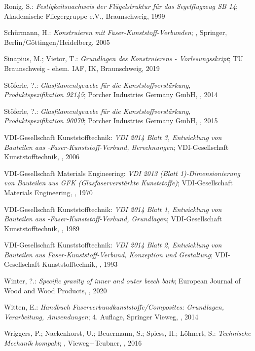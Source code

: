 \begin{thebibliography}{99}
	Ronig, S.:
	\textit{\glqq Festigkeitsnachweis der Flügelstruktur für das Segelflugzeug SB 14\grqq};
	Akademische Fliegergruppe e.V., Braunschweig, 1999 
	
	Schürmann, H.:
	\textit{\glqq Konstruieren mit Faser-Kunststoff-Verbunden\grqq};
	, Springer, Berlin/Göttingen/Heidelberg, 2005 
	
	Sinapius, M.; Vietor, T.:
	\textit{\glqq Grundlagen des Konstruierens - Vorlesungsskript\grqq};
	TU Braunschweig - ehem. IAF, IK, Braunschweig, 2019
	
	Stöferle, ?.:
	\textit{\glqq Glasfilamentgewebe für die Kunststoffverstärkung, Produktspezifikation 92145\grqq};
	Porcher Industries Germany GmbH, , 2014
	
	Stöferle, ?.:
	\textit{\glqq Glasfilamentgewebe für die Kunststoffverstärkung, Produktspezifikation 90070\grqq};
	Porcher Industries Germany GmbH, , 2015
	
	VDI-Gesellschaft Kunststofftechnik:
	\textit{\glqq VDI 2014 Blatt 3, Entwicklung von Bauteilen aus -Faser-Kunststoff-Verbund, Berechnungen\grqq};
	VDI-Gesellschaft Kunststofftechnik, , 2006
	
	VDI-Gesellschaft Materials Engineering:
	\textit{\glqq VDI 2013 (Blatt 1)-Dimensionierung von Bauteilen aus GFK (Glasfaserverstärkte Kunststoffe)\grqq};
	VDI-Gesellschaft Materials Engineering, , 1970
	
	VDI-Gesellschaft Kunststofftechnik:
	\textit{\glqq VDI 2014 Blatt 1, Entwicklung von Bauteilen aus -Faser-Kunststoff-Verbund, Grundlagen\grqq};
	VDI-Gesellschaft Kunststofftechnik, , 1989

	VDI-Gesellschaft Kunststofftechnik:
	\textit{\glqq VDI 2014 Blatt 2, Entwicklung von Bauteilen aus Faser-Kunststoff-Verbund, Konzeption und Gestaltung\grqq};
	VDI-Gesellschaft Kunststofftechnik, , 1993 
	
	Winter, ?.:
	\textit{\glqq Specific gravity of inner and outer beech bark\grqq};
	European Journal of Wood and Wood Products, , 2020
	
	Witten, E.:
	\textit{\glqq Handbuch Faserverbundkunststoffe/Composites: Grundlagen, Verarbeitung, Anwendungen\grqq};
	4. Auflage, Springer Vieweg, , 2014 
	
	Wriggers, P.; Nackenhorst, U.; Beuermann, S.; Spiess, H.; Löhnert, S.:
	\textit{\glqq Technische Mechanik kompakt\grqq};
	, Vieweg+Teubner, , 2016
	
\end{thebibliography}
\endgroup